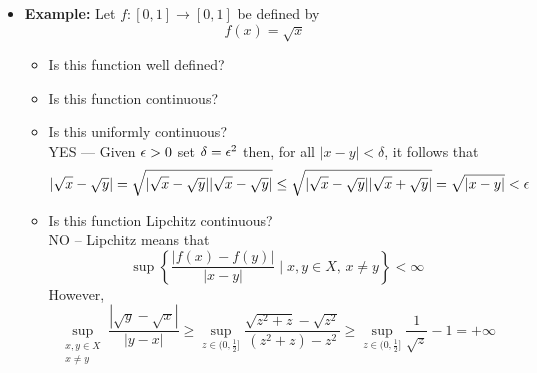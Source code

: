 \documentclass[11pt,twoside]{report}
\begin{document}
\begin{itemize}
\begin{itemize}
\end{itemize}

\begin{center}
\end{center}


\item \textbf{Example:} Let $f \colon [0,1] \to [0,1]$ be defined by
\[
f(x) = \sqrt{x} 
\]
\begin{itemize}
\item Is this function well defined?

\item Is this function continuous?
\item Is this uniformly continuous?\\

YES --- Given $\epsilon > 0$ set $\delta = \epsilon^2$ then, for all $|x-y|  < \delta$, it follows that
\[
|\sqrt{x} - \sqrt{y} | = \sqrt{ |\sqrt{x} - \sqrt{y} | |\sqrt{x} - \sqrt{y} | }  \le  \sqrt{ |\sqrt{x} - \sqrt{y} | |\sqrt{x} + \sqrt{y} | }  = \sqrt{ | x- y|}  < \epsilon 
\]
\item Is this function Lipchitz continuous?\\

NO --   Lipchitz means that
\[
\sup \left\{ \frac{ |f(x) - f(y)| }{ |x- y| } \mid x, y \in X,  \,  x \ne y \right \}  < \infty
\]
However, 
\[ \sup_{\substack{x,y\in X \\ x\neq y}} \frac{|\sqrt{y} - \sqrt{x}|}{|y-x|} \geq \sup_{z\in (0,\frac{1}{2}]} \frac{\sqrt{z^2 + z}-\sqrt{z^2}}{(z^2+z)-z^2} \geq \sup_{z\in (0,\frac{1}{2}]}  \frac{1}{\sqrt{z}} - 1  = + \infty
\]

\end{itemize}


\begin{center}

\end{center}





\end{itemize}
\end{document}
